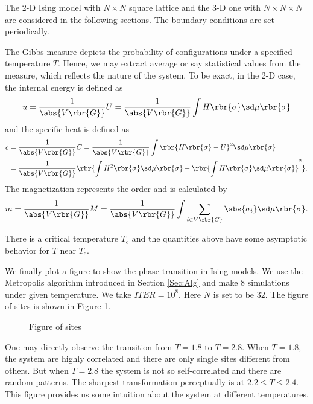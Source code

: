 \documentclass[english, nochinese]{pnote}
\begin{document}
The 2-D Ising model with $ N \times N $ square lattice and the 3-D one with $ N \times N \times N $ are considered in the following sections. The boundary conditions are set periodically.

The Gibbs measure depicts the probability of configurations under a specified temperature $T$. Hence, we may extract average or say statistical values from the measure, which reflects the nature of the system. To be exact, in the 2-D case, the internal energy is defined as
\begin{equation}
u = \frac{1}{\abs{ V \rbr{G} }} U = \frac{1}{\abs{ V \rbr{G} }} \int H \rbr{\sigma} \sd \mu \rbr{\sigma}
\end{equation}
and the specific heat is defined as
\begin{equation}
\begin{split}
c &= \frac{1}{\abs{ V \rbr{G} }} C = \frac{1}{\abs{ V \rbr{G} }} \int \rbr{ H \rbr{\sigma} - U }^2 \sd \mu \rbr{\sigma} \\
&= \frac{1}{\abs{ V \rbr{G} }} \rbr{ \int H^2 \rbr{\sigma} \sd \mu \rbr{\sigma} - \rbr{ \int H \rbr{\sigma} \sd \mu \rbr{\sigma} }^2 }.
\end{split}
\end{equation}
The magnetization represents the order and is calculated by
\begin{equation}
m = \frac{1}{\abs{ V \rbr{G} }} M = \frac{1}{\abs{ V \rbr{G} }} \int \sum_{ i \in V \rbr{G} } \abs{\sigma_i} \sd \mu \rbr{\sigma}.
\end{equation}

There is a critical temperature $T_{\text{c}}$ and the quantities above have some asymptotic behavior for $T$ near $T_{\text{c}}$.

We finally plot a figure to show the phase transition in Ising models. We use the Metropolis algorithm introduced in Section \ref{Sec:Alg} and make 8 simulations under given temperature. We take $ \mathit{ITER} = 10^8 $. Here $N$ is set to be $32$. The figure of sites is shown in Figure \ref{Fig:Sites}.

\begin{figure}[htbp]
\centering
\scalebox{0.75}
{}
\caption{Figure of sites}
\label{Fig:Sites}
\end{figure}

One may directly observe the transition from $ T = 1.8 $ to $ T = 2.8 $. When $ T = 1.8 $, the system are highly correlated and there are only single sites different from others. But when $ T = 2.8 $ the system is not so self-correlated and there are random patterns. The sharpest transformation perceptually is at $ 2.2 \le T \le 2.4 $. This figure provides us some intuition about the system at different temperatures.
\end{document}
